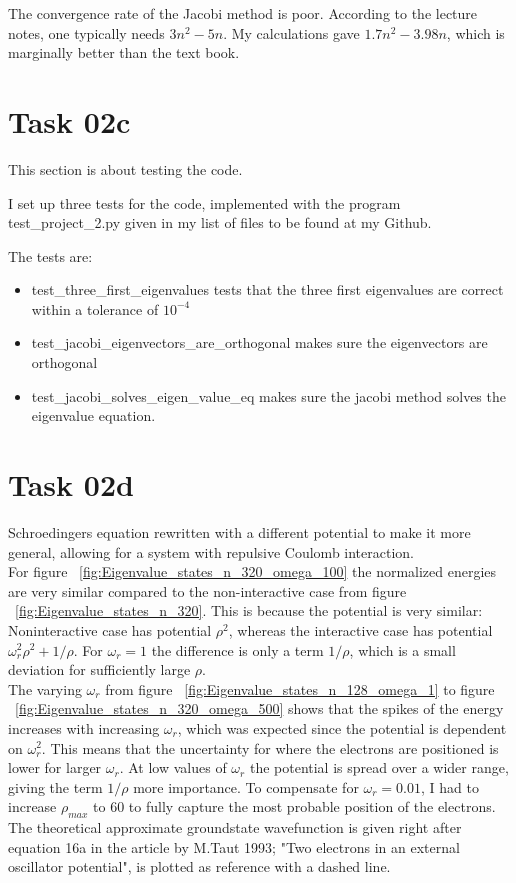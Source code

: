 The convergence rate of the Jacobi method is poor. According to the lecture notes, one typically needs $3n^2-5n$. My calculations gave $1.7n^2-3.98n$, which is marginally better than the text book.



\section{Task 02c}
This section is about testing the code.

I set up three tests for the code, implemented with the program test\_project\_2.py given in my list of files to be found at my Github.

The tests are: \\
\begin{itemize}

\item test\_three\_first\_eigenvalues tests that the three first eigenvalues are correct within a tolerance of $10^{-4}$
\item test\_jacobi\_eigenvectors\_are\_orthogonal makes sure the eigenvectors are orthogonal
\item test\_jacobi\_solves\_eigen\_value\_eq makes sure the jacobi method solves the eigenvalue equation.

\end{itemize}


\section{Task 02d}
Schroedingers equation rewritten with a different potential to make it more general, allowing for a system with repulsive Coulomb interaction.\\


For figure ~\ref{fig:Eigenvalue_states_n_320_omega_100} the normalized energies are very similar compared to the non-interactive case from figure ~\ref{fig:Eigenvalue_states_n_320}. This is because the potential is very similar: Noninteractive case has potential $\rho^2$, whereas the interactive case has potential $\omega_r^2\rho^2+1/\rho$. For $\omega_r = 1$ the difference is only a term $1/\rho$, which is a small deviation for sufficiently large $\rho$. \\

The varying $\omega_r$ from figure ~\ref{fig:Eigenvalue_states_n_128_omega_1} to figure ~\ref{fig:Eigenvalue_states_n_320_omega_500} shows that the spikes of the energy increases with increasing $\omega_r$, which was expected since the potential is dependent on $\omega_r^2$. This means that the uncertainty for where the electrons are positioned is lower for larger $\omega_r$. At low values of $\omega_r$ the potential is spread over a wider range, giving the term $1/\rho$ more importance. To compensate for $\omega_r = 0.01$, I had to increase $\rho_{max}$ to 60  to fully capture the most probable position of the electrons. The theoretical approximate groundstate wavefunction is given right after equation 16a in the article by M.Taut 1993;  "Two electrons in an external oscillator potential", is plotted as reference with a dashed line.


